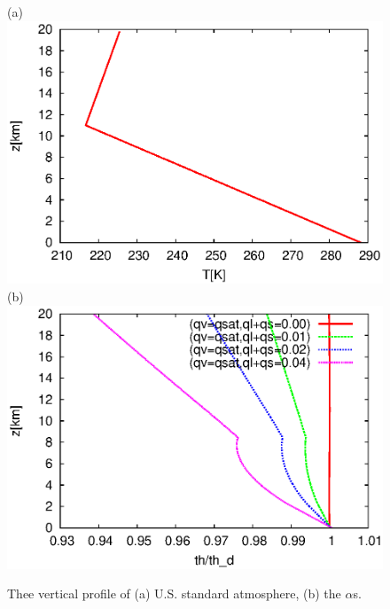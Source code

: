 \documentclass[a4paper]{report}
\begin{document}
\begin{figure}[t]
  (a)\\
  \includegraphics{b.eps}\\
  (b)\\
  \includegraphics{a.eps}\\
  \caption{Thee vertical profile of (a) U.S. standard atmosphere,
  (b) the $\alpha$s.}
  \label{fig:fig1}
\end{figure}
\end{document}
